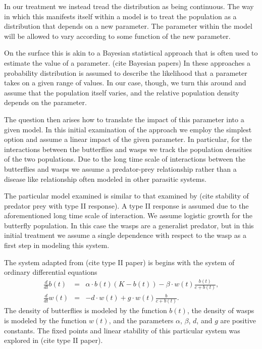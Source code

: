 \documentclass[12pt]{article}
\begin{document}
In our treatment we instead tread the distribution as being
continuous. The way in which this manifests itself within a model is
to treat the population as a distribution that depends on a new
parameter. The parameter within the model will be allowed to vary
according to some function of the new parameter.

On the surface this is akin to a Bayesian statistical approach that is
often used to estimate the value of a parameter. (cite Bayesian
papers) In these approaches a probability distribution is assumed to
describe the likelihood that a parameter takes on a given range of
values. In our case, though, we turn this around and assume that the
population itself varies, and the relative population density depends
on the parameter.

The question then arises how to translate the impact of this parameter
into a given model. In this initial examination of the approach we
employ the simplest option and assume a linear impact of the given
parameter. In particular, for the interactions between the butterflies
and wasps we track the population densities of the two
populations. Due to the long time scale of interactions between the
butterflies and wasps we assume a predator-prey relationship rather
than a disease like relationship often modeled in other parasitic
systems.

The particular model examined is similar to that examined by (cite
stability of predator prey with type II response). A type II response
is assumed due to the aforementioned long time scale of
interaction. We assume logistic growth for the butterfly
population. In this case the wasps are a generalist predator, but in
this initial treatment we assume a single dependence with respect to
the wasp as a first step in modeling this system.

The system adapted from (cite type II paper) is begins with the system
of ordinary differential equations
\begin{eqnarray}
  \label{eq:initialSystem1}
  \frac{d}{dt} b(t) & = & \alpha \cdot b(t) (K - b(t)) - \beta \cdot w(t) \frac{b(t)}{c+b(t)}, \\
  \label{eq:initialSystem2}
  \frac{d}{dt} w(t) & = & -d \cdot w(t) + g \cdot w(t) \frac{b}{c+b(t)}.
\end{eqnarray}
The density of butterflies is modeled by the function $b(t)$, the
density of wasps is modeled by the function $w(t)$, and the parameters
$\alpha$, $\beta$, $d$, and $g$ are positive constants. The fixed
points and linear stability of this particular system was explored in
(cite type II paper). 
\end{document}
